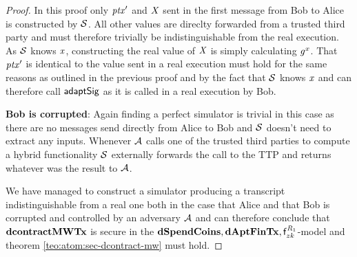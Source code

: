 \begin{proof}
    In this proof only ${\mathit{ptx}}'$ and $\mathit{X}$ sent in the first message from Bob to Alice is constructed by $\mathcal{S}$.
    All other values are direclty forwarded from a trusted third party and must therefore trivially be indistinguishable from the real execution.
    As $\mathcal{S}$ knows $\mathit{x}$, constructing the real value of $\mathit{X}$ is simply calculating $\mathit{g}^{\mathit{x}}$.
    That ${\mathit{ptx}}'$ is identical to the value sent in a real execution must hold for the same reasons as outlined in the previous proof and by the fact that $\mathcal{S}$ knows $\mathit{x}$ and can therefore call $\mathsf{adaptSig}$ as it is called in a real execution by Bob.

    \textbf{Bob is corrupted}: Again finding a perfect simulator is trivial in this case as there are no messages send directly from Alice to Bob and $\mathcal{S}$ doesn't need to extract any inputs.
    Whenever $\mathcal{A}$ calls one of the trusted third parties to compute a hybrid functionality $\mathcal{S}$ externally forwards the call to the TTP and returns whatever was the result to $\mathcal{A}$.

    We have managed to construct a simulator producing a transcript indistinguishable from a real one both in the case that Alice and that Bob is corrupted and controlled by an adversary $\mathcal{A}$ and can therefore conclude that $\mathbf{dcontractMWTx}$ is secure in the $\mathbf{dSpendCoins},\mathbf{dAptFinTx},\mathsf{f}^{\mathit{R}_1}_{zk}$-model and theorem \ref{teo:atom:sec-dcontract-mw} must hold.
\end{proof}